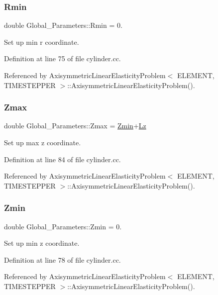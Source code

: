\subsubsection{\texorpdfstring{Rmin}{Rmin}}
{\footnotesize\ttfamily double Global\+\_\+\+Parameters\+::\+Rmin = 0.}



Set up min r coordinate. 



Definition at line 75 of file cylinder.\+cc.



Referenced by Axisymmetric\+Linear\+Elasticity\+Problem$<$ E\+L\+E\+M\+E\+N\+T, T\+I\+M\+E\+S\+T\+E\+P\+P\+E\+R $>$\+::\+Axisymmetric\+Linear\+Elasticity\+Problem().

\mbox{\label{namespaceGlobal__Parameters_a36b7b169826f906d1d8d1a3aa4347d80}} 
\subsubsection{\texorpdfstring{Zmax}{Zmax}}
{\footnotesize\ttfamily double Global\+\_\+\+Parameters\+::\+Zmax = \hyperlink{namespaceGlobal__Parameters_a1813b913bc85d4ce15ea68226ba6c63f}{Zmin}+\hyperlink{namespaceGlobal__Parameters_a2bcf0bd846d839f1e3bb04a6c0a612c1}{Lz}}



Set up max z coordinate. 



Definition at line 84 of file cylinder.\+cc.



Referenced by Axisymmetric\+Linear\+Elasticity\+Problem$<$ E\+L\+E\+M\+E\+N\+T, T\+I\+M\+E\+S\+T\+E\+P\+P\+E\+R $>$\+::\+Axisymmetric\+Linear\+Elasticity\+Problem().

\mbox{\label{namespaceGlobal__Parameters_a1813b913bc85d4ce15ea68226ba6c63f}} 
\subsubsection{\texorpdfstring{Zmin}{Zmin}}
{\footnotesize\ttfamily double Global\+\_\+\+Parameters\+::\+Zmin = 0.}



Set up min z coordinate. 



Definition at line 78 of file cylinder.\+cc.



Referenced by Axisymmetric\+Linear\+Elasticity\+Problem$<$ E\+L\+E\+M\+E\+N\+T, T\+I\+M\+E\+S\+T\+E\+P\+P\+E\+R $>$\+::\+Axisymmetric\+Linear\+Elasticity\+Problem().

